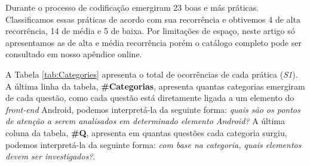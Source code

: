 Durante o processo de codificação emergiram 23 boas e más práticas. Classificamos essas práticas de acordo com sua recorrência e obtivemos 4 de alta recorrência, 14 de média e 5 de baixa. Por limitações de espaço, neste artigo só apresentamos as de alta e média recorrência porém o catálogo completo pode ser consultado em nosso apêndice online.



A Tabela \ref{tab:Categories} apresenta o total de ocorrências de cada prática (\textit{S1}). A última linha da tabela, \textbf{\#Categorias}, apresenta quantas categorias emergiram de cada questão, como cada questão está diretamente ligada a um elemento do \textit{front-end} Android, podemos interpretá-la da seguinte forma: \emph{quais são os pontos de atenção a serem analisados em determinado elemento Android?} A última coluna da tabela, \textbf{\#Q}, apresenta em quantas questões cada categoria surgiu, podemos interpretá-la da seguinte forma: \emph{com base na categoria, quais elementos devem ser investigados?}. 




